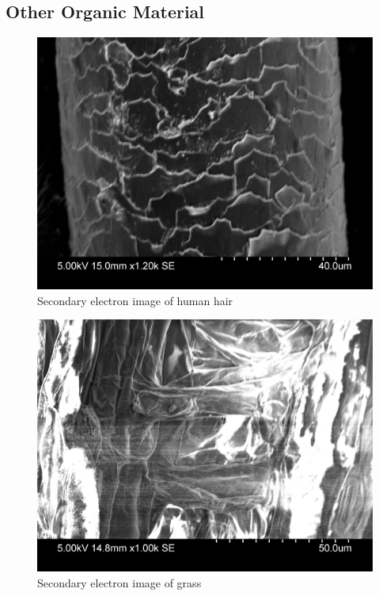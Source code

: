 \documentclass[a4paper]{scrartcl}
\begin{document}
\subsection{Other Organic Material}
\begin{figure}
    \centering
    \includegraphics[width = 15cm]{measurements/SE-hair.png}
    \caption{Secondary electron image of human hair}
    \label{fig:se-hair}
\end{figure}
\begin{figure}
    \centering
    \includegraphics[width = 15cm]{measurements/SE-grass.png}
    \caption{Secondary electron image of grass}
    \label{fig:se-grass}
\end{figure}
\end{document}
